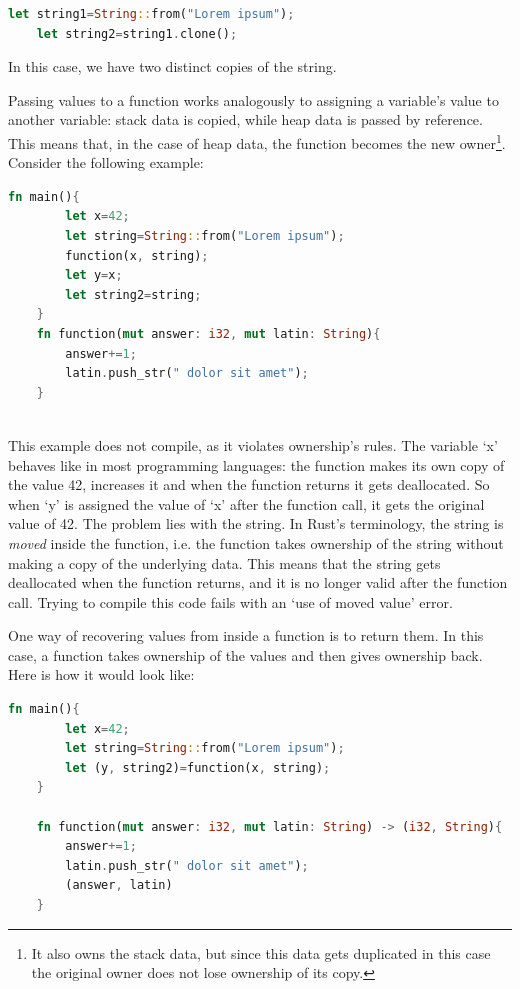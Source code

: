 \documentclass{report}
\begin{document}
\begin{lstlisting}[language=Rust, style=colouredRust]
	let string1=String::from("Lorem ipsum");
	let string2=string1.clone();
\end{lstlisting}

In this case, we have two distinct copies of the string. \par
Passing values to a function works analogously to assigning a variable's value to another variable: stack data is copied, while heap data is passed by reference. This means that, in
the case of heap data, the function becomes the new owner\footnote{It also owns the stack data, but since this data gets duplicated in this case the original owner does not lose
ownership of its copy.}. Consider the following example:

\begin{lstlisting}[language=Rust, style=colouredRust]
	fn main(){
		let x=42;
		let string=String::from("Lorem ipsum");
		function(x, string);
		let y=x;
		let string2=string;
	}
	fn function(mut answer: i32, mut latin: String){
		answer+=1;
		latin.push_str(" dolor sit amet");
	}
	
\end{lstlisting}

This example does not compile, as it violates ownership's rules. The variable \enquote*{x} behaves like in most programming languages: the function makes its own copy of the value
42, increases it and when the function returns it gets deallocated. So when \enquote*{y} is assigned the value of \enquote*{x} after the function call, it gets the original value
of 42. The problem lies with the string. In Rust's terminology, the string is \textit{moved} inside the function, i.e. the function takes ownership of the string without making a
copy of the underlying data. This means that the string gets deallocated when the function returns, and it is no longer valid after the function call. Trying to compile this code
fails with an \enquote*{use of moved value} error.\par

One way of recovering values from inside a function is to return them. In this case, a function takes ownership of the values and then gives ownership back. Here is how it would
look like:

\begin{lstlisting}[language=Rust, style=colouredRust]
    fn main(){
    	let x=42;
        let string=String::from("Lorem ipsum");
        let (y, string2)=function(x, string);
    }

    fn function(mut answer: i32, mut latin: String) -> (i32, String){
        answer+=1;
        latin.push_str(" dolor sit amet");
        (answer, latin)
    }          
\end{lstlisting}
\end{document}
